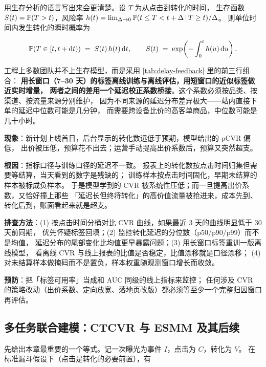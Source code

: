 用生存分析的语言写出来会更清楚。设 $T$ 为从点击到转化的时间，
生存函数 $S(t) = \operatorname{\mathbb{P}}(T > t)$，风险率
$h(t) = \lim_{\Delta \to 0} \operatorname{\mathbb{P}}(t \le T < t+\Delta \,\vert\, T \ge t)/\Delta$。
则单位时间内发生转化的瞬时概率为

\begin{equation}
\operatorname{\mathbb{P}}(T \in [t, t+\mathrm{d} t)) \;=\; S(t)\,h(t)\,\mathrm{d} t, \qquad
S(t) \;=\; \exp\!\left(-\int_0^{t} h(u)\,\mathrm{d} u\right) .
\label{eq:survival}
\end{equation}

工程上多数团队并不上生存模型，而是采用 \cref{tab:delay-feedback} 里的前三行组合：
\textbf{用长窗口（7--30 天）的标签离线训练与离线评估，用短窗口的近似标签做近实时增量，
两者之间的差用一个延迟校正系数桥接}。这个系数必须按品类、按渠道、按流量来源分别维护，
因为不同来源的延迟分布差异极大——站内直接下单的延迟中位数可能是几分钟，
而需要跨设备比价的高客单商品，中位数可能是几十小时。

\begin{pitfall}
\textbf{现象}：新计划上线首日，后台显示的转化数远低于预期，模型给出的 pCVR 偏低，
出价被压低，预算花不出去；运营手动提高出价系数后，预算又突然超支。

\textbf{根因}：指标口径与训练口径的延迟不一致。
报表上的转化数按点击时间归集但需要等结算，当天看到的数字是残缺的；
训练样本按点击时间固化，早期未结算的样本被标成负样本。
于是模型学到的 CVR 被系统性压低；而一旦提高出价系数，又恰好撞上那些
「延迟长但终将转化」的高价值流量被抢进来，成本先到、转化后到，账面看起来就是超支。

\textbf{排查方法}：(1) 按点击时间分桶对比 CVR 曲线，如果最近 3 天的曲线明显低于 30 天前同期，
优先怀疑标签回填；(2) 监控转化延迟的分位数（p50/p90/p99）而不是均值，
延迟分布的尾部变化比均值更早暴露问题；(3) 用长窗口标签重训一版离线模型，
看离线 CVR 与线上报表的比值是否稳定，比值漂移就是口径漂移；
(4) 对未结算样本做掩码而不是置负，样本权重随观测窗口增长而收敛。

\textbf{预防}：把「标签可用率」当成和 AUC 同级的线上指标来监控；
任何涉及 CVR 的策略改动（出价系数、定向放宽、落地页改版）都必须等至少一个完整归因窗口再评估。
\end{pitfall}

\subsection{多任务联合建模：CTCVR 与 ESMM 及其后续}

先给出本章最重要的一个等式。记一次曝光为事件 $I$，点击为 $C$，转化为 $V$。
在标准漏斗假设下（点击是转化的必要前置），有


